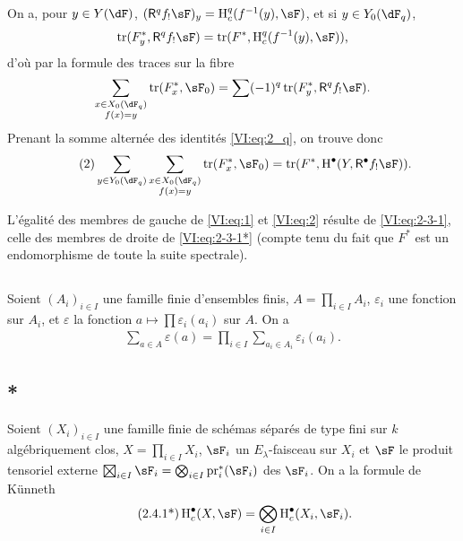 On a, pour $y\in Y(\dF)$, $(\R^q f_! \sF)_y = \h_c^q(f^{-1}(y),\sF)$, et si 
$y\in Y_0(\dF_q)$, 
\[
  \tr(F_y^\ast,\R^q f_! \sF) = \tr(F^\ast,\h_c^q(f^{-1}(y),\sF)) \text{,}
\]
d'o\`u par la formule des traces sur la fibre 
\[
  \sum_{\substack{x\in X_0(\dF_q) \\ f(x) = y}} \tr(F_x^\ast,\sF_0) = \sum (-1)^q \tr(F_y^\ast,\R^q f_! \sF) \text{.}
\]
Prenant la somme altern\'ee des identit\'es \eqref{VI:eq:2_q}, on trouve donc 
\begin{align*}\tag{2}\label{VI:eq:2}
  \sum_{y\in Y_0(\dF_q)} \sum_{\substack{x \in X_0(\dF_q) \\ f(x) = y}} \tr(F_x^\ast,\sF_0) = \tr(F^\ast,\h^\bullet(Y,\R^\bullet f_! \sF)) \text{.}
\end{align*}

L'\'egalit\'e des membres de gauche de \eqref{VI:eq:1} et \eqref{VI:eq:2} 
r\'esulte de \eqref{VI:eq:2-3-1}, celle des membres de droite de 
\eqref{VI:eq:2-3-1*} (compte tenu du fait que $F^\ast$ est un endomorphisme de 
toute la suite spectrale). 





\subsection{}\label{VI:2-4}

Soient $(A_i)_{i\in I}$ une famille finie d'ensembles finis, 
$A=\prod_{i\in I} A_i$, $\varepsilon_i$ une fonction sur $A_i$, et 
$\varepsilon$ la fonction $a\mapsto \prod \varepsilon_i(a_i)$ sur $A$. On a 
\begin{align*}\tag{2.4.1}\label{VI:eq:2-4-1}
  \sum_{a\in A} \varepsilon(a) = \prod_{i\in I} \sum_{a_i\in A_i} \varepsilon_i(a_i) \text{.}
\end{align*}





\addtocounter{subsection}{-1}
\subsection{*}\label{VI:2-4*}

Soient $(X_i)_{i\in I}$ une famille finie de sch\'emas s\'epar\'es de type fini 
sur $k$ alg\'ebriquement clos, $X=\prod_{i\in I} X_i$, $\sF_i$ un 
$E_\lambda$-faisceau sur $X_i$ et $\sF$ le produit tensoriel externe 
$\bigboxtimes_{i\in I}\sF_i = \bigotimes_{i\in I} \operatorname{pr}_i^\ast(\sF_i)$ 
des $\sF_i$. On a la formule de K\"unneth 
\begin{align*}\tag{2.4.1*}\label{VI:eq:2-4-1*}
  \h_c^\bullet(X,\sF) = \bigotimes_{i\in I} \h_c^\bullet(X_i,\sF_i) \text{.}
\end{align*}

